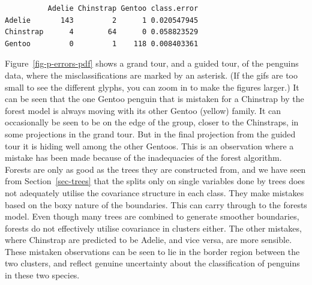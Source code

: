 \documentclass[
  letterpaper,
]{krantz}
\newenvironment{Shaded}{\begin{snugshade}}{\end{snugshade}}
\newcommand{\AttributeTok}[1]{\textcolor[rgb]{0.40,0.45,0.13}{#1}}
\newcommand{\DecValTok}[1]{\textcolor[rgb]{0.68,0.00,0.00}{#1}}
\newcommand{\FunctionTok}[1]{\textcolor[rgb]{0.28,0.35,0.67}{#1}}
\newcommand{\NormalTok}[1]{\textcolor[rgb]{0.00,0.23,0.31}{#1}}
\newcommand{\OtherTok}[1]{\textcolor[rgb]{0.00,0.23,0.31}{#1}}
\newcommand{\SpecialCharTok}[1]{\textcolor[rgb]{0.37,0.37,0.37}{#1}}
\begin{document}

\begin{Shaded}
\end{Shaded}

\begin{verbatim}
          Adelie Chinstrap Gentoo class.error
Adelie       143         2      1 0.020547945
Chinstrap      4        64      0 0.058823529
Gentoo         0         1    118 0.008403361
\end{verbatim}

\begin{Shaded}
\end{Shaded}

Figure~\ref{fig-p-errors-pdf} shows a grand tour, and a guided tour, of
the penguins data, where the misclassifications are marked by an
asterisk. (If the gifs are too small to see the different glyphs, you
can zoom in to make the figures larger.) It can be seen that the one
Gentoo penguin that is mistaken for a Chinstrap by the forest model is
always moving with its other Gentoo (yellow) family. It can occasionally
be seen to be on the edge of the group, closer to the Chinstraps, in
some projections in the grand tour. But in the final projection from the
guided tour it is hiding well among the other Gentoos. This is an
observation where a mistake has been made because of the inadequacies of
the forest algorithm. Forests are only as good as the trees they are
constructed from, and we have seen from Section~\ref{sec-trees} that the
splits only on single variables done by trees does not adequately
utilise the covariance structure in each class. They make mistakes based
on the boxy nature of the boundaries. This can carry through to the
forests model. Even though many trees are combined to generate smoother
boundaries, forests do not effectively utilise covariance in clusters
either. The other mistakes, where Chinstrap are predicted to be Adelie,
and vice versa, are more sensible. These mistaken observations can be
seen to lie in the border region between the two clusters, and reflect
genuine uncertainty about the classification of penguins in these two
species.
\end{document}
